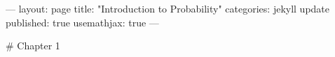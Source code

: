 ---
layout: page
title:  "Introduction to Probability"
categories: jekyll update
published: true
usemathjax: true
---

\usepackage{amsmath,amsfonts,amsthm, amssymb}

\newenvironment{exercise}[2][Exercise]
    {  >> \hline \\ \textbf{#1 #2} \\}
    {  }

\newenvironment{proof}[1][PROOF]
    {  > \textbf{#1} \\ \hline}
    { }

# Chapter 1
